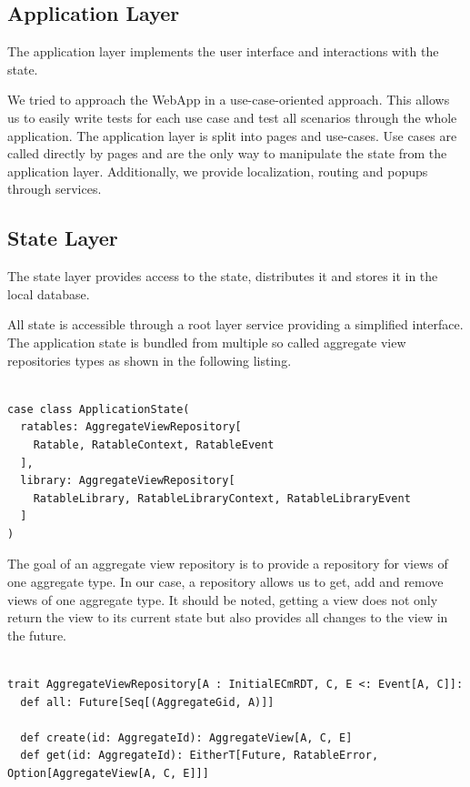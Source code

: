 \documentclass[
	ngerman,
	ruledheaders=section,   %
	class=report,		    %
	thesis={type=bachelor}, %
	accentcolor=9c,			%
	custommargins=false,    %
	marginpar=false,        %
	parskip=half-,          %
	fontsize=11pt,          %
]{tudapub}
\begin{document}
\subsection{Application Layer}
The application layer implements the user interface and interactions with the state. 

We tried to approach the WebApp in a use-case-oriented approach. This allows us to easily write tests for each use case and test all scenarios through the whole application. The application layer is split into pages and use-cases. Use cases are called directly by pages and are the only way to manipulate the state from the application layer. Additionally, we provide localization, routing and popups through services.

\subsection{State Layer}
The state layer provides access to the state, distributes it and stores it in the local database. 

All state is accessible through a root layer service providing a simplified interface. The application state is bundled from multiple so called aggregate view repositories types as shown in the following listing.

\begin{lstlisting}

case class ApplicationState(
  ratables: AggregateViewRepository[
    Ratable, RatableContext, RatableEvent
  ],
  library: AggregateViewRepository[
    RatableLibrary, RatableLibraryContext, RatableLibraryEvent
  ]
)

\end{lstlisting}

The goal of an aggregate view repository is to provide a repository for views of one aggregate type. In our case, a repository allows us to get, add and remove views of one aggregate type. It should be noted, getting a view does not only return the view to its current state but also provides all changes to the view in the future.

\begin{lstlisting}

trait AggregateViewRepository[A : InitialECmRDT, C, E <: Event[A, C]]:
  def all: Future[Seq[(AggregateGid, A)]]
  
  def create(id: AggregateId): AggregateView[A, C, E]
  def get(id: AggregateId): EitherT[Future, RatableError, Option[AggregateView[A, C, E]]]

\end{lstlisting}
\end{document}
